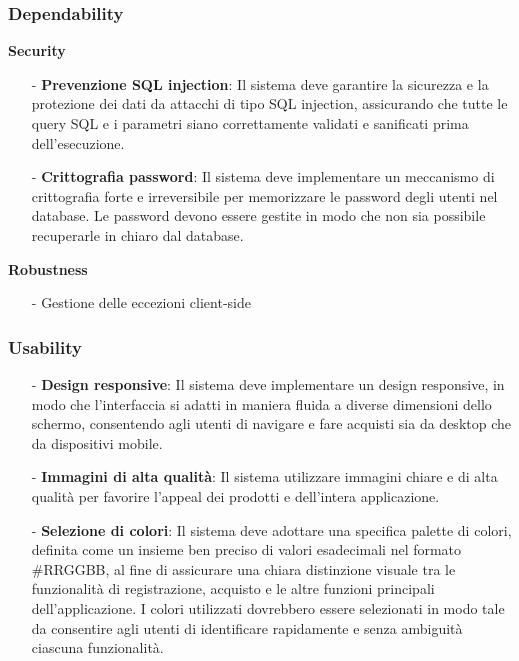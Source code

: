 \documentclass[12pt, a4paper, oneside]{book}
\begin{document}
        \subsubsection*{Dependability}
            \textbf{Security}
                \begin{itemize}
                    \item [-] \textbf{Prevenzione SQL injection}: Il sistema deve garantire la sicurezza e la protezione dei dati da attacchi di tipo SQL injection, assicurando che tutte le query SQL e i parametri siano correttamente validati e sanificati prima dell'esecuzione.
                    \item [-] \textbf{Crittografia password}: Il sistema deve implementare un meccanismo di crittografia forte e irreversibile per memorizzare le password degli utenti nel database. Le password devono essere gestite in modo che non sia possibile recuperarle in chiaro dal database.
                \end{itemize}
            \textbf{Robustness}
                \begin{itemize}
                    \item [-] Gestione delle eccezioni client-side
                \end{itemize}

        \subsubsection*{Usability}
            \begin{itemize}
                \item [-] \textbf{Design responsive}: Il sistema deve implementare un design responsive, in modo che l'interfaccia si adatti in maniera fluida a diverse dimensioni dello schermo, consentendo agli utenti di navigare e fare acquisti sia da desktop che da dispositivi mobile.
                \item [-] \textbf{Immagini di alta qualità}: Il sistema utilizzare immagini chiare e di alta qualità per favorire l'appeal dei prodotti e dell'intera applicazione.
                \item [-] \textbf{Selezione di colori}: Il sistema deve adottare una specifica palette di colori, definita come un insieme ben preciso di valori esadecimali nel formato \#RRGGBB, al fine di assicurare una chiara distinzione visuale tra le funzionalità di registrazione, acquisto e le altre funzioni principali dell'applicazione. I colori utilizzati dovrebbero essere selezionati in modo tale da consentire agli utenti di identificare rapidamente e senza ambiguità ciascuna funzionalità.
            \end{itemize}
\end{document}
